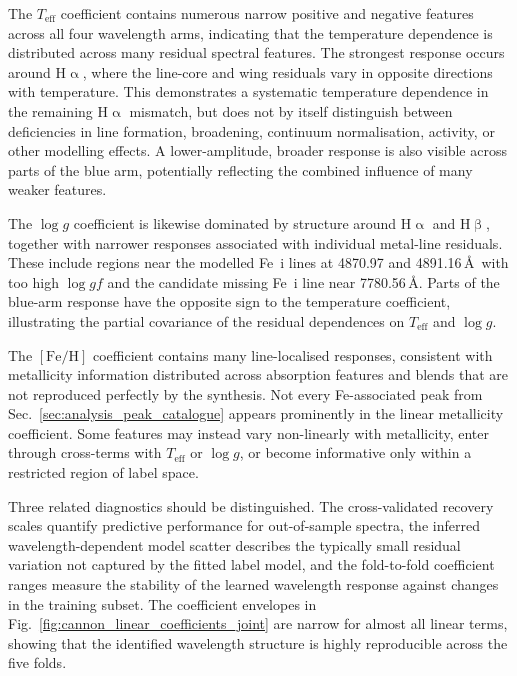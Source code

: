 \documentclass[twocolumn,apj,numberedappendix,appendixfloats]{openjournal}
\begin{document}
The $T_\mathrm{eff}$ coefficient contains numerous narrow positive and negative features across all four wavelength arms, indicating that the temperature dependence is distributed across many residual spectral features. The strongest response occurs around $\mathrm{H}\upalpha$, where the line-core and wing residuals vary in opposite directions with temperature. This demonstrates a systematic temperature dependence in the remaining $\mathrm{H}\upalpha$ mismatch, but does not by itself distinguish between deficiencies in line formation, broadening, continuum normalisation, activity, or other modelling effects. A lower-amplitude, broader response is also visible across parts of the blue arm, potentially reflecting the combined influence of many weaker features.

The $\log g$ coefficient is likewise dominated by structure around $\mathrm{H}\upalpha$ and $\mathrm{H}\upbeta$, together with narrower responses associated with individual metal-line residuals. These include regions near the modelled Fe~{\sc i} lines at 4870.97 and 4891.16\,\AA\ with too high $\log gf$ and the candidate missing Fe~{\sc i} line near 7780.56\,\AA. Parts of the blue-arm response have the opposite sign to the temperature coefficient, illustrating the partial covariance of the residual dependences on $T_\mathrm{eff}$ and $\log g$.

The $[\mathrm{Fe/H}]$ coefficient contains many line-localised responses, consistent with metallicity information distributed across absorption features and blends that are not reproduced perfectly by the synthesis. Not every Fe-associated peak from Sec.~\ref{sec:analysis_peak_catalogue} appears prominently in the linear metallicity coefficient. Some features may instead vary non-linearly with metallicity, enter through cross-terms with $T_\mathrm{eff}$ or $\log g$, or become informative only within a restricted region of label space.

Three related diagnostics should be distinguished. The cross-validated recovery scales quantify predictive performance for out-of-sample spectra, the inferred wavelength-dependent model scatter describes the typically small residual variation not captured by the fitted label model, and the fold-to-fold coefficient ranges measure the stability of the learned wavelength response against changes in the training subset. The coefficient envelopes in Fig.~\ref{fig:cannon_linear_coefficients_joint} are narrow for almost all linear terms, showing that the identified wavelength structure is highly reproducible across the five folds.
\end{document}
